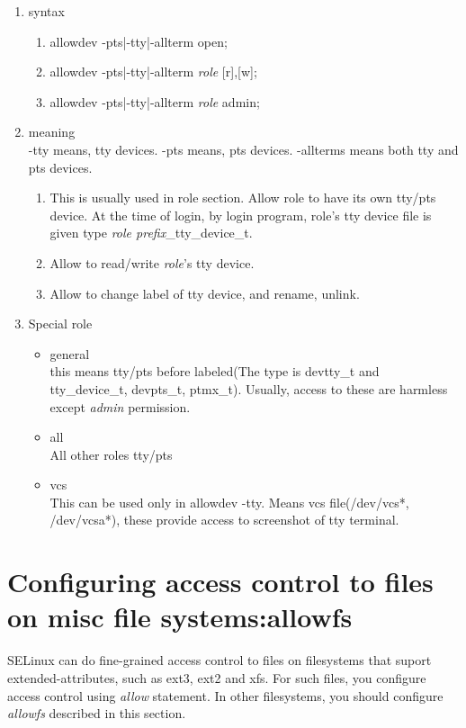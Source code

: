 \documentclass{article}
\begin{document}
\begin{enumerate}
 \item syntax
      \begin{enumerate}
       \item allowdev -pts|-tty|-allterm open;
       \item allowdev -pts|-tty|-allterm {\it role} [r],[w];  
       \item allowdev -pts|-tty|-allterm {\it role} admin;
      \end{enumerate}
 \item meaning\\
       -tty means, tty devices. -pts means, pts devices. -allterms means
       both tty and pts devices.
       \begin{enumerate}
	\item This is usually used in role section. Allow role to have
	      its own tty/pts device. At the time of login, by login
	      program, role's tty device file is given type {\it {\it role prefix}}\_tty\_device\_t. 
	\item  Allow to read/write {\it {\it role}}'s tty
	      device. 
	\item Allow to change label of tty device, and rename, unlink.
       \end{enumerate}
       \item Special role\\
       \begin{itemize}
	\item general\\
	      this means tty/pts before labeled(The type is devtty\_t
	      and tty\_device\_t, devpts\_t, ptmx\_t). Usually, access
	      to these are harmless except {\it admin } permission.
	\item all\\
	      All other roles tty/pts
	\item vcs\\
	      This can be used only in allowdev -tty. Means vcs file(/dev/vcs*, /dev/vcsa*), these provide access to screenshot of tty terminal. 
       \end{itemize}

\end{enumerate}

\section{Configuring access control to files on misc file systems:allowfs}
 SELinux can do fine-grained access control to files on filesystems that
 suport extended-attributes, such as ext3, ext2 and xfs. For such files,
 you configure access control using {\it allow} statement. In other
 filesystems, you should configure {\it allowfs} described in this
 section.
\end{document}
